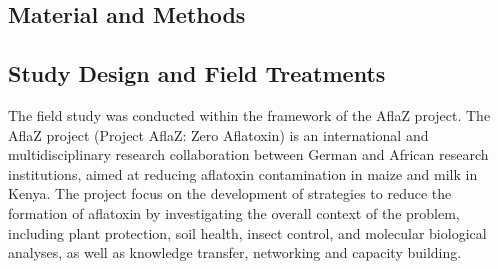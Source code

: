 \begin{refsection}
\section{Material and Methods}

\subsection{Study Design and Field Treatments}

The field study was conducted within the framework of the AflaZ project. The AflaZ project (Project AflaZ: Zero Aflatoxin) is an international and multidisciplinary research collaboration between German and African research institutions, aimed at reducing aflatoxin contamination in maize and milk in Kenya. The project focus on the development of strategies to reduce the formation of aflatoxin by investigating the overall context of the problem, including plant protection, soil health, insect control, and molecular biological analyses, as well as knowledge transfer, networking and capacity building. 


\end{refsection}

